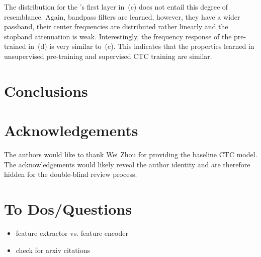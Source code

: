 \documentclass{INTERSPEECH2023}
\begin{document}
The distribution for the \wvtwo \fe's first layer in \,(c) does not entail this degree of resemblance.
Again, bandpass filters are learned, however, they have a wider passband, their center frequencies are distributed rather linearly and the stopband attenuation is weak.
Interestingly, the frequency response of the pre-trained \wvtwo \fe in \,(d) is very similar to \,(c).
This indicates that the properties learned in unsupervised pre-training and supervised \gls{CTC} training are similar.


\section{Conclusions}

\section{Acknowledgements}

\ifinterspeechfinal
     The authors would like to thank Wei Zhou for providing the baseline \gls{CTC} model.
\else
     The acknowledgements would likely reveal the author identity and are therefore hidden for the double-blind review process.
\fi

{
\color{red}
\section{To Dos/Questions}
\begin{itemize}
  \item \wvtwo feature extractor vs. feature encoder
  \item check for arxiv citations
\end{itemize}
}



\end{document}
